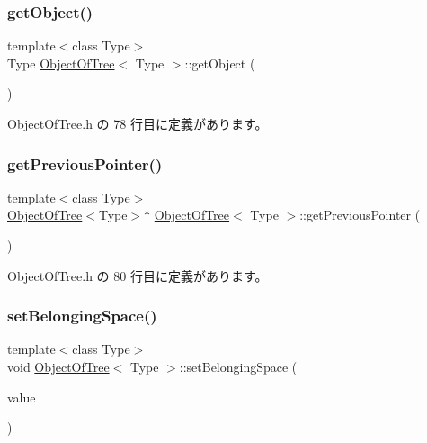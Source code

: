 \subsubsection{\texorpdfstring{get\+Object()}{getObject()}}
{\footnotesize\ttfamily template$<$class Type$>$ \\
Type \mbox{\hyperlink{class_object_of_tree}{Object\+Of\+Tree}}$<$ Type $>$\+::get\+Object (\begin{DoxyParamCaption}{ }\end{DoxyParamCaption})\hspace{0.3cm}{\ttfamily [inline]}}



 Object\+Of\+Tree.\+h の 78 行目に定義があります。

\mbox{\label{class_object_of_tree_a02b74f20b90ec53dbae2d18648a9d5d1}} 
\subsubsection{\texorpdfstring{get\+Previous\+Pointer()}{getPreviousPointer()}}
{\footnotesize\ttfamily template$<$class Type$>$ \\
\mbox{\hyperlink{class_object_of_tree}{Object\+Of\+Tree}}$<$Type$>$$\ast$ \mbox{\hyperlink{class_object_of_tree}{Object\+Of\+Tree}}$<$ Type $>$\+::get\+Previous\+Pointer (\begin{DoxyParamCaption}{ }\end{DoxyParamCaption})\hspace{0.3cm}{\ttfamily [inline]}}



 Object\+Of\+Tree.\+h の 80 行目に定義があります。

\mbox{\label{class_object_of_tree_a21dc9105d1a5a0d045dc43894bba3c1c}} 
\subsubsection{\texorpdfstring{set\+Belonging\+Space()}{setBelongingSpace()}}
{\footnotesize\ttfamily template$<$class Type$>$ \\
void \mbox{\hyperlink{class_object_of_tree}{Object\+Of\+Tree}}$<$ Type $>$\+::set\+Belonging\+Space (\begin{DoxyParamCaption}\item[{\mbox{\hyperlink{class_space_of_tree}{Space\+Of\+Tree}}$<$ Type $>$ $\ast$}]{value }\end{DoxyParamCaption})\hspace{0.3cm}{\ttfamily [inline]}}



